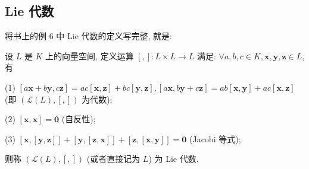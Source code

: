 \documentclass{ctexart}
\begin{document}
\subsection{Lie 代数}
将书上的例 6 中 Lie 代数的定义写完整, 就是:
\begin{definition}
    设 $L$ 是 $K$ 上的向量空间, 定义运算 $[,]:L\times L\to L$ 满足: $\forall a,b,c\in K,\boldsymbol{x},\boldsymbol{y},\boldsymbol{z}\in L$, 有

    (1) $[a\boldsymbol{x}+b\boldsymbol{y},c\boldsymbol{z}]=ac[\boldsymbol{x},\boldsymbol{z}]+bc[\boldsymbol{y},\boldsymbol{z}],[a\boldsymbol{x},b\boldsymbol{y}+c\boldsymbol{z}]=ab[\boldsymbol{x},\boldsymbol{y}]+ac[\boldsymbol{x},\boldsymbol{z}]$ (即 $(\mathcal{L}(L),[,])$ 为代数);

    (2) $[\boldsymbol{x},\boldsymbol{x}]=\boldsymbol{0}$ (自反性);

    (3) $[\boldsymbol{x},[\boldsymbol{y},\boldsymbol{z}]]+[\boldsymbol{y},[\boldsymbol{z},\boldsymbol{x}]]+[\boldsymbol{z},[\boldsymbol{x},\boldsymbol{y}]]=\boldsymbol{0}$ (Jacobi 等式);

    则称 $(\mathcal{L}(L),[,])$ (或者直接记为 $L$) 为 Lie 代数.
\end{definition}
\end{document}
